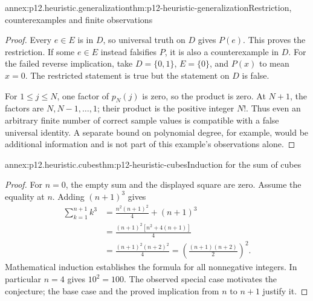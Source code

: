\begin{annexitem}{annex:p12.heuristic.generalization}{thm:p12-heuristic-generalization}{Restriction, counterexamples and finite observations}
\begin{proof}
Every \(e\in E\) is in \(D\), so universal truth on \(D\)
gives \(P(e)\). This proves the restriction. If some \(e\in E\)
instead falsifies \(P\), it is also a counterexample in \(D\).
For the failed reverse implication, take \(D=\{0,1\}\),
\(E=\{0\}\), and \(P(x)\) to mean \(x=0\).
The restricted statement is true but the statement on \(D\) is false.

For \(1\le j\le N\), one factor of \(p_N(j)\) is zero,
so the product is zero. At \(N+1\), the factors are
\(N,N-1,\ldots,1\); their product is the positive integer
\(N!\). Thus even an arbitrary finite number of correct sample
values is compatible with a false universal identity. A separate
bound on polynomial degree, for example, would be additional
information and is not part of this example's observations alone.
\end{proof}
\end{annexitem}

\begin{annexitem}{annex:p12.heuristic.cubes}{thm:p12-heuristic-cubes}{Induction for the sum of cubes}
\begin{proof}
For \(n=0\), the empty sum and the displayed square are zero.
Assume the equality at \(n\). Adding \((n+1)^3\) gives
\[
\begin{aligned}
 \sum_{k=1}^{n+1}k^3
 &=\frac{n^2(n+1)^2}{4}+(n+1)^3\\
 &=\frac{(n+1)^2[n^2+4(n+1)]}{4}\\
 &=\frac{(n+1)^2(n+2)^2}{4}
  =\left(\frac{(n+1)(n+2)}2\right)^2.
\end{aligned}
\]
Mathematical induction establishes the formula for all
nonnegative integers. In particular \(n=4\) gives \(10^2=100\).
The observed special case motivates the conjecture; the base case
and the proved implication from \(n\) to \(n+1\) justify it.
\end{proof}
\end{annexitem}


